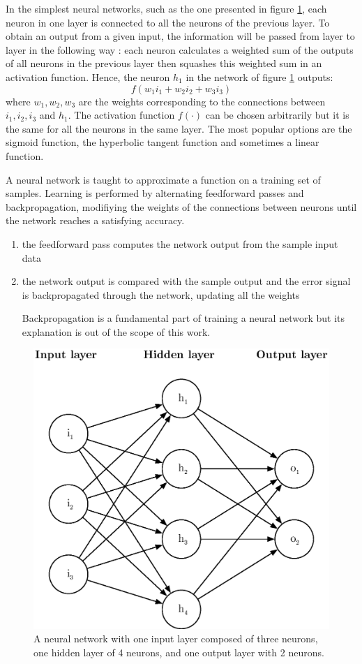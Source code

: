 In the simplest neural networks, such as the one presented in figure 
\ref{fig:neural_network}, each neuron in one layer is connected to all the
neurons of the previous layer. To obtain an output from a given input,
the information will be passed from layer to layer in the following way : 
each neuron calculates a weighted sum of the outputs of all neurons in the
previous layer then squashes this weighted sum in an activation function. 
Hence, the neuron $h_1$ in the network of figure \ref{fig:neural_network}
outputs:
$$ f(w_1i_1 + w_2i_2 + w_3i_3) $$
where $w_1, w_2, w_3$ are the weights corresponding to the connections between
$i_1, i_2, i_3$ and $h_1$. The activation function $f(\cdot)$ can be chosen 
arbitrarily but it is
the same for all the neurons in the same layer. The most popular options are
the sigmoid function, the hyperbolic tangent function and sometimes a linear
function.

A neural network is taught to approximate a function on a training
set of samples. Learning is performed by alternating feedforward passes and 
backpropagation, modifiying the weights of the connections between neurons until
the network reaches a satisfying accuracy.

\begin{enumerate}
	\item the feedforward pass computes the network output from the sample
		input data
	\item the network output is compared with the sample output and the
		error signal is backpropagated through the network, updating
		all the weights

Backpropagation is a fundamental part of training a neural network but its
explanation is out of the scope of this work.
	
\end{enumerate}

\begin{figure}[]
	\centering
	\includegraphics[width=0.6\linewidth]{fig/neural_network.eps}
	\caption{A neural network with one input layer composed of three neurons,
	one hidden layer of 4 neurons, and one output layer with 2 neurons.}
	\label{fig:neural_network}
\end{figure}

